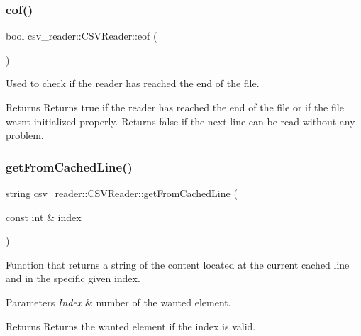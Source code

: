 \subsubsection{\texorpdfstring{eof()}{eof()}}
{\footnotesize\ttfamily bool csv\+\_\+reader\+::\+C\+S\+V\+Reader\+::eof (\begin{DoxyParamCaption}{ }\end{DoxyParamCaption})}

Used to check if the reader has reached the end of the file. \begin{DoxyReturn}{Returns}
Returns \textquotesingle{}true\textquotesingle{} if the reader has reached the end of the file or if the file wasn\textquotesingle{}t initialized properly. Returns \textquotesingle{}false\textquotesingle{} if the next line can be read without any problem. 
\end{DoxyReturn}
\mbox{\label{classcsv__reader_1_1CSVReader_a9f589ea936d84a8c7f774ceb8d93d9a2}} 
\subsubsection{\texorpdfstring{get\+From\+Cached\+Line()}{getFromCachedLine()}\hspace{0.1cm}{\footnotesize\ttfamily [1/2]}}
{\footnotesize\ttfamily string csv\+\_\+reader\+::\+C\+S\+V\+Reader\+::get\+From\+Cached\+Line (\begin{DoxyParamCaption}\item[{const int \&}]{index }\end{DoxyParamCaption})}

Function that returns a string of the content located at the current cached line and in the specific given index. 
\begin{DoxyParams}{Parameters}
{\em Index} & number of the wanted element. \\
\hline
\end{DoxyParams}
\begin{DoxyReturn}{Returns}
Returns the wanted element if the index is valid. 
\end{DoxyReturn}
\mbox{\label{classcsv__reader_1_1CSVReader_a3be8bcb33ec67ae9edeb711f534d840d}} 
